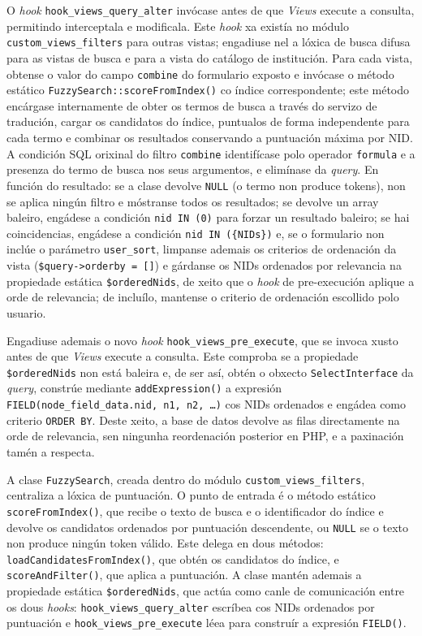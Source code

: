 \documentclass[%
    a4paper,               %
    twoside,               %
    10pt,                  %
]{article}                 %
\begin{document}
O \textit{hook} \texttt{hook\_views\_query\_alter} invócase antes de que \textit{Views} execute a consulta, permitindo interceptala e modificala. Este \textit{hook} xa existía no módulo \texttt{custom\_views\_filters} para outras vistas; engadiuse nel a lóxica de busca difusa para as vistas de busca e para a vista do catálogo de institución. Para cada vista, obtense o valor do campo \texttt{combine} do formulario exposto e invócase o método estático \texttt{FuzzySearch::scoreFromIndex()} co índice correspondente; este método encárgase internamente de obter os termos de busca a través do servizo de tradución, cargar os candidatos do índice, puntualos de forma independente para cada termo e combinar os resultados conservando a puntuación máxima por NID. A condición SQL orixinal do filtro \texttt{combine} identifícase polo operador \texttt{formula} e a presenza do termo de busca nos seus argumentos, e elimínase da \textit{query}. En función do resultado: se a clase devolve \texttt{NULL} (o termo non produce tokens), non se aplica ningún filtro e móstranse todos os resultados; se devolve un array baleiro, engádese a condición \texttt{nid IN (0)} para forzar un resultado baleiro; se hai coincidencias, engádese a condición \texttt{nid IN (\{NIDs\})} e, se o formulario non inclúe o parámetro \texttt{user\_sort}, limpanse ademais os criterios de ordenación da vista (\texttt{\$query->orderby = []}) e gárdanse os NIDs ordenados por relevancia na propiedade estática \texttt{\$orderedNids}, de xeito que o \textit{hook} de pre-execución aplique a orde de relevancia; de incluílo, mantense o criterio de ordenación escollido polo usuario.

Engadiuse ademais o novo \textit{hook} \texttt{hook\_views\_pre\_execute}, que se invoca xusto antes de que \textit{Views} execute a consulta. Este comproba se a propiedade \texttt{\$orderedNids} non está baleira e, de ser así, obtén o obxecto \texttt{SelectInterface} da \textit{query}, constrúe mediante \texttt{addExpression()} a expresión \texttt{FIELD(node\_field\_data.nid, n1, n2, \ldots)} cos NIDs ordenados e engádea como criterio \texttt{ORDER BY}. Deste xeito, a base de datos devolve as filas directamente na orde de relevancia, sen ningunha reordenación posterior en PHP, e a paxinación tamén a respecta.

A clase \texttt{FuzzySearch}, creada dentro do módulo \texttt{custom\_views\_filters}, centraliza a lóxica de puntuación. O punto de entrada é o método estático \texttt{scoreFromIndex()}, que recibe o texto de busca e o identificador do índice e devolve os candidatos ordenados por puntuación descendente, ou \texttt{NULL} se o texto non produce ningún token válido. Este delega en dous métodos: \texttt{loadCandidatesFromIndex()}, que obtén os candidatos do índice, e \texttt{scoreAndFilter()}, que aplica a puntuación. A clase mantén ademais a propiedade estática \texttt{\$orderedNids}, que actúa como canle de comunicación entre os dous \textit{hooks}: \texttt{hook\_views\_query\_alter} escríbea cos NIDs ordenados por puntuación e \texttt{hook\_views\_pre\_execute} léea para construír a expresión \texttt{FIELD()}.
\end{document}
